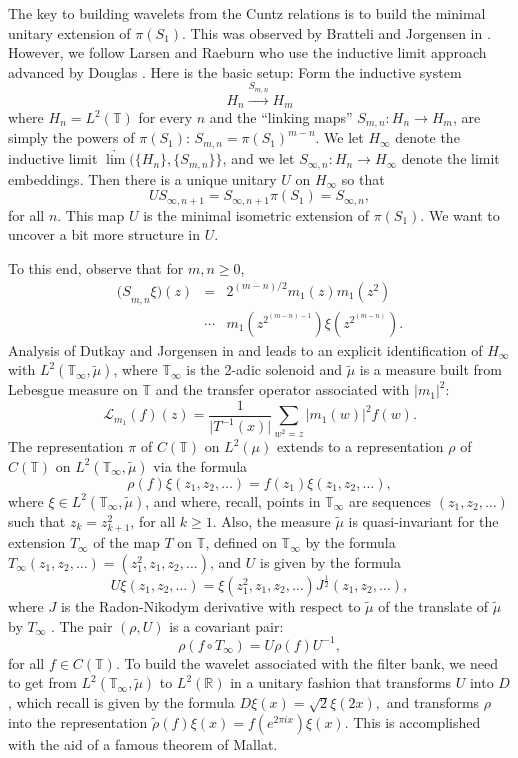 \documentclass{amsproc}
\theoremstyle{plain}
\theoremstyle{definition}
\theoremstyle{definition}
\theoremstyle{remark}
\theoremstyle{plain}
\begin{document}
The key to building wavelets from the Cuntz relations is to build
the minimal unitary extension of $\pi(S_{1})$. This was observed
by Bratteli and Jorgensen in \cite{BJ97}. However, we follow Larsen
and Raeburn \cite{LR06} who use the inductive limit approach advanced
by Douglas \cite{rD69}. Here is the basic setup: Form the inductive
system\[
H_{n}\stackrel{S_{m,n}}{\longrightarrow}H_{m}\]
 where $H_{n}=L^{2}(\mathbb{T})$ for every $n$ and the ``linking
maps'' $S_{m,n}:H_{n}\to H_{m}$, are simply the powers of $\pi(S_{1})$:
$S_{m,n}=\pi(S_{1})^{m-n}$. We let $H_{\infty}$ denote the inductive
limit $\underrightarrow{\lim}(\{ H_{n}\},\{ S_{m,n}\}\}$, and we
let $S_{\infty,n}:H_{n}\to H_{\infty}$ denote the limit embeddings.
Then there is a unique unitary $U$ on $H_{\infty}$ so that\[
US_{\infty,n+1}=S_{\infty,n+1}\pi(S_{1})=S_{\infty,n},\]
for all $n$. This map $U$ is the minimal isometric extension of
$\pi(S_{1})$. We want to uncover a bit more structure in $U$. 

To this end, observe that for $m,n\ge0$,\begin{eqnarray*}
{(S}_{m,n}\xi)(z) & = & 2^{(m-n)/2}m_{1}(z)m_{1}(z^{2})\\
 & \cdots & m_{1}(z^{2^{(m-n)-1}})\xi(z^{2^{(m-n)}}).\end{eqnarray*}
Analysis of Dutkay and Jorgensen in \cite{DJ05} and \cite[Proposition 2.2]{DJ06}
leads to an explicit identification of $H_{\infty}$ with
$L^{2}(\mathbb{T}_{\infty},\tilde{\mu})$,
where $\mathbb{T}_{\infty}$ is the 2-adic solenoid and $\tilde{\mu}$
is a measure built from Lebesgue measure on $\mathbb{T}$ and the
transfer operator associated with $\vert m_{1}\vert^{2}$:\[
\mathcal{L}_{m_{1}}(f)(z)=\frac{1}{\vert T^{-1}(x)\vert}\sum_{w^{2}=z}\vert
m_{1}(w)\vert^{2}f(w).\]
 The representation $\pi$ of $C(\mathbb{T})$ on $L^{2}(\mu)$ extends
to a representation $\rho$ of $C(\mathbb{T})$ on
$L^{2}(\mathbb{T}_{\infty},\tilde{\mu})$
via the formula \[
\rho(f)\xi(z_{1},z_{2},\ldots)=f(z_{1})\xi(z_{1},z_{2},\ldots),\]
where $\xi\in L^{2}(\mathbb{T}_{\infty},\tilde{\mu})$, and where,
recall, points in $\mathbb{T}_{\infty}$ are sequences $(z_{1},z_{2},\ldots)$
such that $z_{k}=z_{k+1}^{2}$, for all $k\geq1$. Also, the measure
$\tilde{\mu}$ is quasi-invariant for the extension $T_{\infty}$
of the map $T$ on $\mathbb{T}$, defined on $\mathbb{T}_{\infty}$
by the formula $T_{\infty}(z_{1},z_{2},\ldots)=(z_{1}^{2},z_{1},z_{2},\ldots)$,
and $U$ is given by the formula
$$U\xi(z_{1},z_{2},\ldots)=\xi(z_{1}^{2},z_{1},z_{2},\ldots)J^{\frac{1}{2}}(z_{1}
,z_{2},\ldots),$$
where $J$ is the Radon-Nikodym derivative with respect to $\tilde{\mu}$
of the translate of $\tilde{\mu}$ by $T_{\infty}$ . The pair $(\rho,U)$
is a covariant pair: \[
\rho(f\circ T_{\infty})=U\rho(f)U^{-1},\]
for all $f\in C(\mathbb{T})$. To build the wavelet associated with
the filter bank, we need to get from $L^{2}(\mathbb{T}_{\infty},\tilde{\mu})$
to $L^{2}(\mathbb{R})$ in a unitary fashion that transforms $U$
into $D$, which recall is given by the formula $D\xi(x)=\sqrt{2}\xi(2x),$
and transforms $\rho$ into the representation $\tilde{\rho}(f)\xi(x)=f(e^{2\pi
ix})\xi(x)$.
This is accomplished with the aid of a famous theorem of Mallat.  
\end{document}
